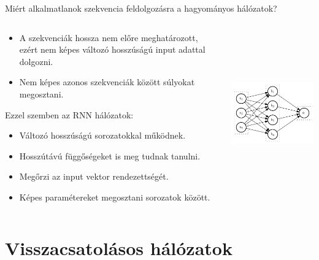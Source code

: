 \documentclass[english, aspectratio=169]{beamer}
\makeatletter
\let\origtableofcontents=\tableofcontents
\def\tableofcontents{\@ifnextchar[{\origtableofcontents}{\gobbletableofcontents}}
\def\gobbletableofcontents#1{\origtableofcontents}
\makeatother
\begin{document}
\begin{frame}{Miért alkalmatlanok szekvencia feldolgozásra a hagyományos hálózatok?}
\begin{columns}
\begin{column}{.6\textwidth}
\begin{itemize}
	\item A szekvenciák hossza nem előre meghatározott, ezért nem képes változó hosszúságú input adattal dolgozni. 
	\item Nem képes azonos szekvenciák között súlyokat megosztani. 
\end{itemize}
Ezzel szemben az RNN hálózatok:
\begin{itemize}
	\item Változó hosszúságú sorozatokkal működnek.
	\item Hosszútávú függőségeket is meg tudnak tanulni.
	\item Megőrzi az input vektor rendezettségét.
	\item Képes paramétereket megosztani sorozatok között.
\end{itemize}
\end{column}
\begin{column}{.5\textwidth}
\begin{center}
\includegraphics[height=7cm, width=7cm, keepaspectratio]{../../7_dl/doc/graphs/dl_2.png}
\end{center}
\end{column}
\end{columns}
\end{frame}

\section{Visszacsatolásos hálózatok}

\begin{frame}
\tableofcontents[currentsection]
\end{frame}
\end{document}
